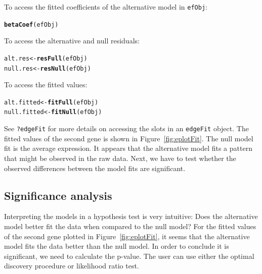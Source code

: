 \documentclass{article}\usepackage[]{graphicx}\usepackage[]{color}
\makeatletter
\newcommand{\hlstd}[1]{\textcolor[rgb]{0.345,0.345,0.345}{#1}}%
\newcommand{\hlkwb}[1]{\textcolor[rgb]{0.69,0.353,0.396}{#1}}%
\newcommand{\hlkwd}[1]{\textcolor[rgb]{0.737,0.353,0.396}{\textbf{#1}}}%
\newenvironment{kframe}{%
 \def\at@end@of@kframe{}%
 \ifinner\ifhmode%
  \def\at@end@of@kframe{\end{minipage}}%
  \begin{minipage}{\columnwidth}%
 \fi\fi%
 \def\FrameCommand##1{\hskip\@totalleftmargin \hskip-\fboxsep
 \colorbox{shadecolor}{##1}\hskip-\fboxsep
     \hskip-\linewidth \hskip-\@totalleftmargin \hskip\columnwidth}%
 \MakeFramed {\advance\hsize-\width
   \@totalleftmargin\z@ \linewidth\hsize
   \@setminipage}}%
 {\par\unskip\endMakeFramed%
 \at@end@of@kframe}
\newenvironment{knitrout}{}{} %
\makeatother
\begin{document}
To access the fitted coefficients of the alternative model in {\tt efObj}:
\begin{knitrout}
\color{fgcolor}\begin{kframe}
\begin{alltt}
\hlkwd{betaCoef}\hlstd{(efObj)}
\end{alltt}
\end{kframe}
\end{knitrout}
To access the alternative and null residuals:
\begin{knitrout}
\color{fgcolor}\begin{kframe}
\begin{alltt}
\hlstd{alt.res} \hlkwb{<-} \hlkwd{resFull}\hlstd{(efObj)}
\hlstd{null.res} \hlkwb{<-} \hlkwd{resNull}\hlstd{(efObj)}
\end{alltt}
\end{kframe}
\end{knitrout}
To access the fitted values:
\begin{knitrout}
\color{fgcolor}\begin{kframe}
\begin{alltt}
\hlstd{alt.fitted} \hlkwb{<-} \hlkwd{fitFull}\hlstd{(efObj)}
\hlstd{null.fitted} \hlkwb{<-} \hlkwd{fitNull}\hlstd{(efObj)}
\end{alltt}
\end{kframe}
\end{knitrout}

See {\tt ?edgeFit} for more details on accessing the slots in an {\tt edgeFit} object. The fitted values of the second gene is shown in Figure~\ref{fig:eplotFit}. The null model fit is the average expression. It appears that the alternative model fits a pattern that might be observed in the raw data. Next, we have to test whether the observed differences between the model fits are significant.

\subsection{Significance analysis}
Interpreting the models in a hypothesis test is very intuitive: Does the alternative model better fit the data when compared to the null model? For the fitted values of the second gene plotted in Figure~\ref{fig:eplotFit}, it seems that the alternative model fits the data better than the null model. In order to conclude it is significant, we need to calculate the p-value. The user can use either the optimal discovery procedure or likelihood ratio test. 
\end{document}
